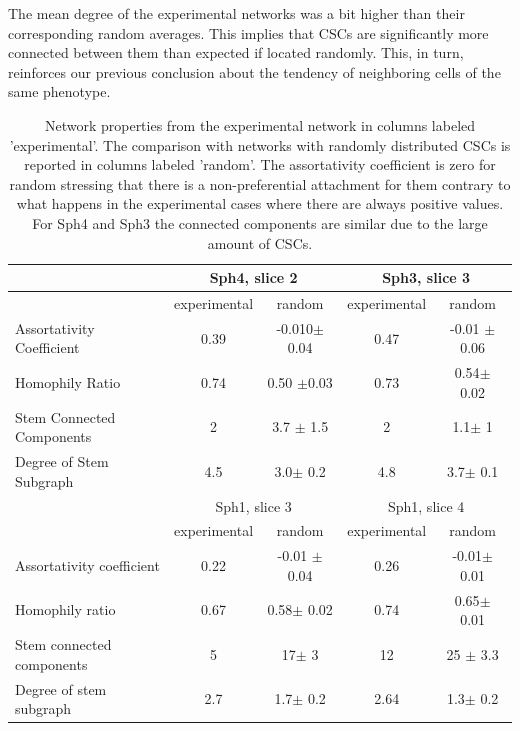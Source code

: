 \documentclass[fleqn,10pt]{wlscirep}
\begin{document}
The mean degree of the experimental networks was a bit higher than their corresponding random averages. This implies that CSCs are significantly more connected between them than expected if located randomly. This, in turn, reinforces our previous conclusion about the tendency of neighboring cells of the same phenotype. 
% 



\begin{table}[htbp]
\centering
\begin{tabular}{|l|c|c|c|c|}
\hline
 & \multicolumn{2}{|c|}{{\textsf Sph4, slice 2}}  &  \multicolumn{2}{|c|}{{\textsf Sph3, slice 3}}\\
\hline
 &experimental &random& experimental & random\\
\hline
Assortativity Coefficient &
0.39 & -0.010$\pm$ 0.04& 0.47 & -0.01 $\pm$ 0.06 \\
\hline
Homophily Ratio &  0.74&0.50 $\pm$0.03&0.73&  0.54$\pm$  0.02  \\
\hline
Stem Connected Components &2& 3.7 $\pm$ 1.5 &2&  1.1$\pm$  1 \\
\hline
Degree of Stem Subgraph &4.5& 3.0$\pm$ 0.2  &4.8& 3.7$\pm$ 0.1\\
\hline
\hline
\hline
 & \multicolumn{2}{|c|}{{\textsf Sph1, slice 3}} & \multicolumn{2}{|c|}{{\textsf Sph1, slice 4}}  \\
\hline
 & experimental & random& experimental&random \\
\hline
Assortativity coefficient &0.22 & -0.01 $\pm$ 0.04   &0.26& -0.01$\pm$ 0.01  \\
\hline
Homophily ratio  &0.67& 0.58$\pm$ 0.02 &0.74& 0.65$\pm$  0.01 \\
\hline
Stem connected components &5& 17$\pm$ 3 &12& 25 $\pm$ 3.3 \\
\hline
Degree of stem subgraph &2.7& 1.7$\pm$ 0.2 & 2.64 & 1.3$\pm$ 0.2  \\
\hline

\end{tabular}
\caption{Network properties from the experimental network in columns labeled 'experimental'. The comparison with networks with randomly distributed CSCs is reported in columns labeled 'random'. The assortativity coefficient is zero for random stressing that there is a non-preferential attachment for them contrary to what happens in the experimental cases where there are always positive values. For {\textsf Sph4} and {\textsf Sph3} the connected components are similar due to the large amount of CSCs.  }
\label{tab: ensemble statistics}
\end{table}
\end{document}
